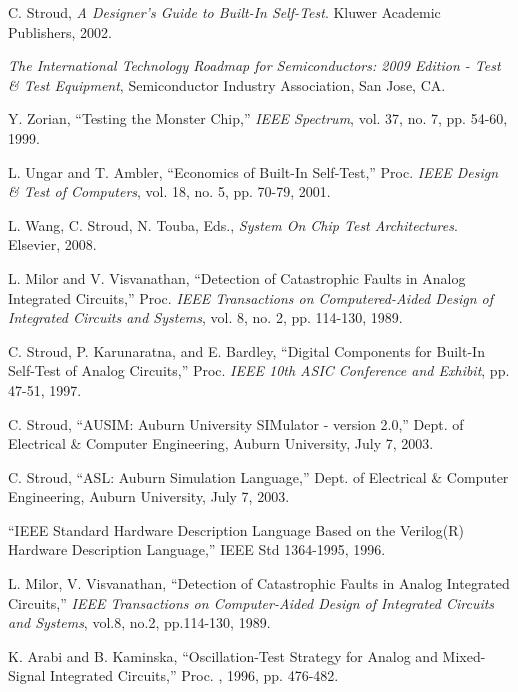 \documentclass[12pt]{report}
\begin{document}
\begin{thebibliography}{99}

 C. Stroud, \textit{A Designer's Guide to Built-In Self-Test}. Kluwer Academic Publishers, 2002.

 \textit{The International Technology Roadmap for Semiconductors: 2009 Edition - Test \& Test Equipment}, Semiconductor Industry Association, San Jose, CA.

 Y. Zorian, ``Testing the Monster Chip,'' \textit{IEEE Spectrum}, vol. 37, no. 7, pp. 54-60, 1999.

 L. Ungar and T. Ambler, ``Economics of Built-In Self-Test,'' Proc. \textit{IEEE Design \& Test of Computers}, vol. 18, no. 5, pp. 70-79, 2001. 

 L. Wang, C. Stroud, N. Touba, Eds., \textit{System On Chip Test Architectures}. Elsevier, 2008.

 L. Milor and V. Visvanathan, ``Detection of Catastrophic Faults in Analog Integrated Circuits,'' Proc. \textit{IEEE Transactions on Computered-Aided Design of Integrated Circuits and Systems}, vol. 8, no. 2, pp. 114-130, 1989.

 C. Stroud, P. Karunaratna, and E. Bardley, ``Digital Components for Built-In Self-Test of Analog Circuits,'' Proc. \textit{IEEE 10th ASIC Conference and Exhibit}, pp. 47-51, 1997.

 C. Stroud, ``AUSIM: Auburn University SIMulator - version 2.0,'' Dept. of Electrical \& 
Computer Engineering, Auburn University, July 7, 2003.

 C. Stroud, ``ASL: Auburn Simulation Language,'' Dept. of Electrical \& Computer
Engineering, Auburn University, July 7, 2003.

 ``IEEE Standard Hardware Description Language Based on the Verilog(R) Hardware Description Language,'' IEEE Std 1364-1995, 1996.

 L. Milor, V. Visvanathan, ``Detection of Catastrophic Faults in Analog Integrated Circuits,'' \textit{IEEE Transactions on Computer-Aided Design of Integrated Circuits and Systems}, vol.8, no.2, pp.114-130, 1989.

 K. Arabi and B. Kaminska, ``Oscillation-Test Strategy for Analog and Mixed-Signal Integrated Circuits,'' Proc. ,  1996, pp. 476-482.


\end{thebibliography}
\end{document}
